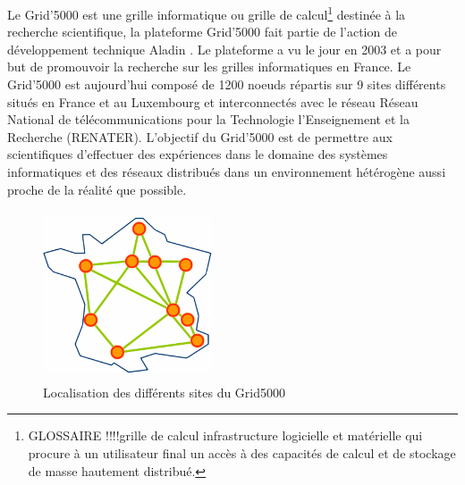 \documentclass[a4paper, 10pt, onecolumn]{report}
\begin{document}
Le Grid'5000 est une grille informatique ou grille de calcul\footnote{GLOSSAIRE !!!!grille de calcul infrastructure logicielle et matérielle qui procure à un utilisateur final un accès à des capacités de calcul et de stockage de masse hautement distribué.} destinée à la recherche scientifique, la plateforme Grid'5000 fait partie de l'action de développement technique Aladin . Le plateforme a vu le jour en 2003 et a pour but de promouvoir la recherche sur les grilles informatiques en France. Le Grid'5000 est aujourd'hui composé de 1200 noeuds répartis sur 9 sites différents situés en France et au Luxembourg et interconnectés avec le réseau Réseau National de télécommunications pour la Technologie l'Enseignement et la Recherche (RENATER). L'objectif du Grid'5000 est de permettre aux scientifiques d'effectuer des expériences dans le domaine des systèmes informatiques et des réseaux distribués dans un environnement hétérogène aussi proche de la réalité que possible.

	\begin{figure}[!h]
		\centering
   		\includegraphics[width=5cm,height=5cm]{map.png}
   		\caption{Localisation des différents sites du Grid5000}
    	\label{fig:map}
	\end{figure} 
\end{document}
